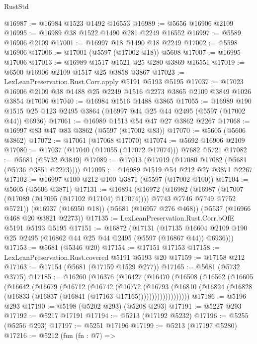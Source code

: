 \begin{lexlean}{RustStd}
\begin{coremodule}
@16987 := @16984 @1523 @1492 @16553
@16989 := @5656 @16906 @2109
@16995 := @16989 @38 @1522 @1490 @281 @2249 @16552
@16997 := @5589 @16906 @2109
@17001 := @16997 @18 @1490 @18 @2249
@17002 := @5598 @16906
@17006 := @17001 (@5597 (@17002 @18)) @5608
@17007 := @16995 @17006
@17013 := @16989 @1517 @1521 @25 @280 @3869 @16551
@17019 := @6500 @16906 @2109 @1517 @25 @3858 @3867
@17023 := LexLeanPreservation.Rust.Corr.apply @5191 @5193 @5195
@17037 := @17023 @16906 @2109 @38 @1488 @25 @2249 @1516 @2273 @3865 @2109 @3849 @1026 @3854 @17006
@17040 := @16984 @1516 @1488 @3865
@17055 := @16989
    @190
    @1515
    @25
    @123
    @2495
    @3864
    (@16997 @44 @25 @44 @2495 (@5597 (@17002 @44)) @6936)
@17061 := @16989 @1513 @54 @47 @27 @3862 @2267
@17068 := @16997 @83 @47 @83 @3862 (@5597 (@17002 @83))
@17070 := @5605 (@5606 @3862)
@17072 := @17061 (@17068 @17070)
@17074 := @5692 @16906 @2109
@17080 := @17037 (@17040 (@17055 (@17072 @17074))) @7682 @5721
@17082 := @5681 (@5732 @3849)
@17089 := @17013 (@17019 (@17080 @17082 (@5681 (@5736 @3851 @2273))))
@17095 := @16989 @1519 @54 @212 @27 @3871 @2267
@17102 := @16997 @100 @212 @100 @3871 (@5597 (@17002 @100))
@17104 := @5605 (@5606 @3871)
@17131 := @16894
    (@16972
      (@16982
        (@16987 (@17007 (@17089 (@17095 (@17102 @17104) @17074))))
        @7743
        @7746
        @7749
        @7752
        @5721))
    (@16937 (@16950 @18))
    (@5681 (@16957 @276 @468))
    (@5537 (@16966 @468 @20 @3821 @2273))
@17135 := LexLeanPreservation.Rust.Corr.bOfE @5191 @5193 @5195
@17151 := @16872
    (@17131
      (@17135 @16604 @2109 @190 @25 @2495 (@16862 @44 @25 @44 @2495 (@5597 (@16867 @44)) @6936)))
@17153 := @5681 (@5346 @20)
@17154 := @17151 @17153
@17158 := LexLeanPreservation.Rust.covered @5191 @5193 @20
@17159 := @17158 @212
@17163 := @17154 (@5681 (@17159 @1529 @277))
@17165 := @5681 (@5732 @3775)
@17185 := @16260
    (@16376
      (@16427
        (@16470
          (@16508
            (@16562
              (@16605
                (@16642
                  (@16679
                    (@16712
                      (@16742
                        (@16772
                          (@16793
                            (@16810
                              (@16824
                                (@16828 (@16833 (@16837 (@16841 (@17163 @17165)))))))))))))))))))
@17186 := @5196 @293
@17190 := @5198 (@5202 @293) (@5208 @293)
@17191 := @5227 @293
@17192 := @5217 @17191
@17194 := @5213 (@17192 @5232)
@17196 := @5255 (@5256 @293)
@17197 := @5251 @17196
@17199 := @5213 (@17197 @5280)
@17216 := @5212
    (fun (fn : @7) =>

\end{coremodule}
\end{lexlean}
